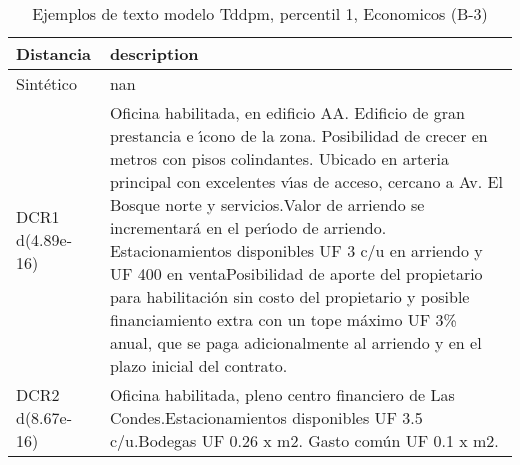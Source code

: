 \begin{table}[H]
\centering
\fontsize{10}{14}\selectfont
\caption{Ejemplos de texto modelo Tddpm, percentil 1, Economicos (B-3)}
\label{table-example-economicos-b-3-tddpm_mlp-1p-text}
\begin{tabular}{|l|m{35em}|}
\hline
\rowcolor[gray]{0.8}
Distancia & description \\
\hline Sintético & nan \\
\hline DCR1 d(4.89e-16) & Oficina habilitada, en edificio AA. Edificio de gran prestancia e {\'\i}cono de la zona. Posibilidad de crecer en metros con pisos colindantes. Ubicado en arteria principal con excelentes v{\'\i}as de acceso, cercano a Av. El Bosque norte y servicios.Valor de arriendo se incrementar\'a en el per{\'\i}odo de arriendo. Estacionamientos disponibles UF 3 c/u en arriendo y UF 400 en ventaPosibilidad de aporte del propietario para habilitaci\'on sin costo del propietario y posible financiamiento extra con un tope m\'aximo UF 3\% anual, que se paga adicionalmente al arriendo y en el plazo inicial del contrato. \\
\hline DCR2 d(8.67e-16) & Oficina habilitada, pleno centro financiero de Las Condes.Estacionamientos disponibles UF 3.5 c/u.Bodegas UF 0.26 x m2. Gasto com\'un UF 0.1 x m2. \\
\hline
\end{tabular}
\end{table}
